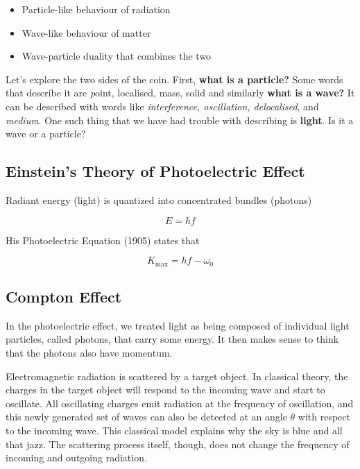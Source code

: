 \documentclass[english, 11pt]{article}
\begin{document}
       \begin{itemize}
         \item Particle-like behaviour of radiation
         \item Wave-like behaviour of matter
         \item Wave-particle duality that combines the two
       \end{itemize}

       Let's explore the two sides of the coin. First, {\bf what is a particle?} Some words that describe it are {\textit point, localised, mass, solid} and similarly {\bf what is a wave?} It can be described with words like \textit{interference, oscillation, delocalised}, and \textit{medium}. One such thing that we have had trouble with describing is {\bf light}. Is it a wave or a particle?

     \subsection{Einstein's Theory of Photoelectric Effect}

       Radiant energy (light) is quantized into concentrated bundles (photons)

       \[ E = hf \]

       His Photoelectric Equation (1905) states that

       \[ K_{\mbox{max}} = hf - \omega_0 \]

     \subsection{Compton Effect}

       In the photoelectric effect, we treated light as being composed of individual light particles, called photons, that carry some energy. It then makes sense to think that the photons also have momentum.
       \newline

       Electromagnetic radiation is scattered by a target object. In classical theory, the charges in the target object will respond to the incoming wave and start to oscillate. All oscillating charges emit radiation at the frequency of oscillation, and this newly generated set of waves can also be detected at an angle $\theta$ with respect to the incoming wave. This classical model explains why the sky is blue and all that jazz. The scattering process itself, though, does not change the frequency of incoming and outgoing radiation.
       \newline
\end{document}
